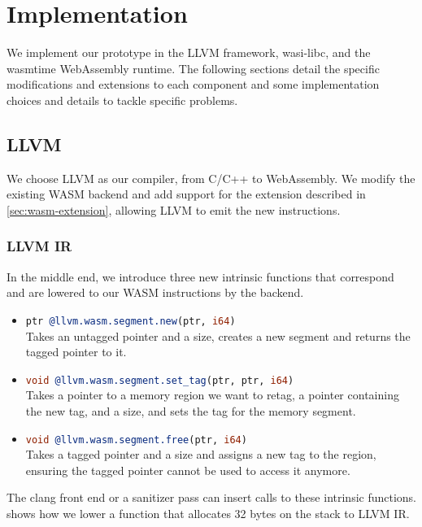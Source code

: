 \chapter{Implementation}
\label{ch:implementation}

We implement our prototype in the LLVM framework, wasi-libc, and the wasmtime WebAssembly runtime.
The following sections detail the specific modifications and extensions to each component and some implementation choices and details to tackle specific problems.


\section{LLVM}
\label{sec:llvm}

We choose LLVM as our compiler, from C/C++ to WebAssembly.
We modify the existing \ac{WASM} backend and add support for the extension described in \cref{sec:wasm-extension}, allowing LLVM to emit the new instructions.

\subsection{LLVM IR}
\label{subsec:llvm-ir}

In the middle end, we introduce three new intrinsic functions that correspond and are lowered to our \ac{WASM} instructions by the backend.

\begin{itemize}
    \item[] \lstinline[style=customc,language=llvm]{ptr @llvm.wasm.segment.new(ptr, i64)} \\
    Takes an untagged pointer and a size, creates a new segment and returns the tagged pointer to it.
    \item[] \lstinline[style=customc,language=llvm]{void @llvm.wasm.segment.set_tag(ptr, ptr, i64)} \\
    Takes a pointer to a memory region we want to retag, a pointer containing the new tag, and a size, and sets the tag for the memory segment.
    \item[] \lstinline[style=customc,language=llvm]{void @llvm.wasm.segment.free(ptr, i64)} \\
    Takes a tagged pointer and a size and assigns a new tag to the region, ensuring the tagged pointer cannot be used to access it anymore.
\end{itemize}

\noindent
The clang front end or a sanitizer pass can insert calls to these intrinsic functions.
 shows how we lower a function that allocates 32 bytes on the stack to LLVM IR.

